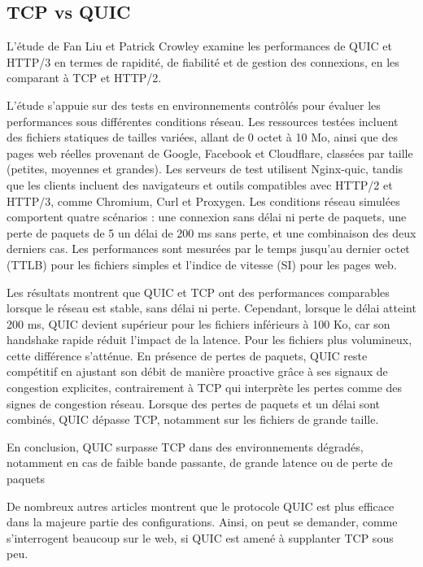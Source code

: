 \documentclass[a4paper,12pt]{article}
\begin{document}
\subsection{TCP vs QUIC}

L'étude de Fan Liu et Patrick Crowley\cite{liu_security_2023} examine les
performances de QUIC et HTTP/3 en termes de rapidité, de fiabilité et de gestion des
connexions, en les comparant à TCP et HTTP/2. 

L’étude s’appuie sur des tests en environnements contrôlés pour évaluer les
performances sous différentes conditions réseau. Les ressources testées incluent des
fichiers statiques de tailles variées, allant de 0 octet à 10 Mo, ainsi que des pages web
réelles provenant de Google, Facebook et Cloudflare, classées par taille (petites,
moyennes et grandes). Les serveurs de test utilisent Nginx-quic, tandis que les clients
incluent des navigateurs et outils compatibles avec HTTP/2 et HTTP/3, comme
Chromium, Curl et Proxygen. Les conditions réseau simulées comportent quatre
scénarios : une connexion sans délai ni perte de paquets, une perte de paquets de 5 %
un délai de 200 ms sans perte, et une combinaison des deux derniers cas. Les
performances sont mesurées par le temps jusqu’au dernier octet (TTLB) pour les
fichiers simples et l’indice de vitesse (SI) pour les pages web.

Les résultats montrent que QUIC et TCP ont des performances comparables lorsque le
réseau est stable, sans délai ni perte. Cependant, lorsque le délai atteint 200 ms, QUIC
devient supérieur pour les fichiers inférieurs à 100 Ko, car son handshake rapide réduit
l’impact de la latence. Pour les fichiers plus volumineux, cette différence s’atténue. En
présence de pertes de paquets, QUIC reste compétitif en ajustant son débit de manière
proactive grâce à ses signaux de congestion explicites, contrairement à TCP qui
interprète les pertes comme des signes de congestion réseau. Lorsque des pertes de
paquets et un délai sont combinés, QUIC dépasse TCP, notamment sur les fichiers de
grande taille.

En conclusion, QUIC surpasse TCP dans des environnements dégradés, notamment en
cas de faible bande passante, de grande latence ou de perte de paquets



De nombreux autres articles montrent que le protocole QUIC est plus efficace dans la majeure partie des configurations. \cite{mucke_reacked_2024} \cite{muthuraj_replication_2024} \cite{yu_dissecting_2021} Ainsi, on peut se demander, comme s'interrogent beaucoup sur le web, si QUIC est amené à supplanter TCP sous peu.
\end{document}

